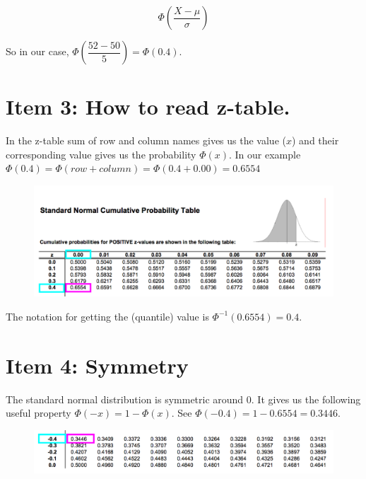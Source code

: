 \documentclass[]{book}
\theoremstyle{definition}
\theoremstyle{definition}
\theoremstyle{definition}
\theoremstyle{remark}
\begin{document}
\[\Phi \left(\dfrac{X-\mu}{\sigma}\right)\]

So in our case, \(\Phi \left(\dfrac{52-50}{5}\right) = \Phi(0.4)\).

\hypertarget{item-3-how-to-read-z-table.}{%
\section{Item 3: How to read
z-table.}\label{item-3-how-to-read-z-table.}}

In the z-table sum of row and column names gives us the value (\(x\))
and their corresponding value gives us the probability \(\Phi(x)\). In
our example
\(\Phi(0.4) = \Phi(row + column) = \Phi(0.4 + 0.00) = 0.6554\)

\begin{figure}
\begin{center}
\includegraphics[width=0.95\columnwidth]{img/ss1}
\end{center}
\end{figure}

The notation for getting the (quantile) value is
\(\Phi^{-1}(0.6554) = 0.4\).

\hypertarget{item-4-symmetry}{%
\section{Item 4: Symmetry}\label{item-4-symmetry}}

The standard normal distribution is symmetric around 0. It gives us the
following useful property \(\Phi(-x) = 1 - \Phi(x)\). See
\(\Phi(-0.4) = 1 - 0.6554 = 0.3446\).

\begin{figure}
\begin{center}
\includegraphics[width=0.95\columnwidth]{img/ss2}
\end{center}
\end{figure}
\end{document}
